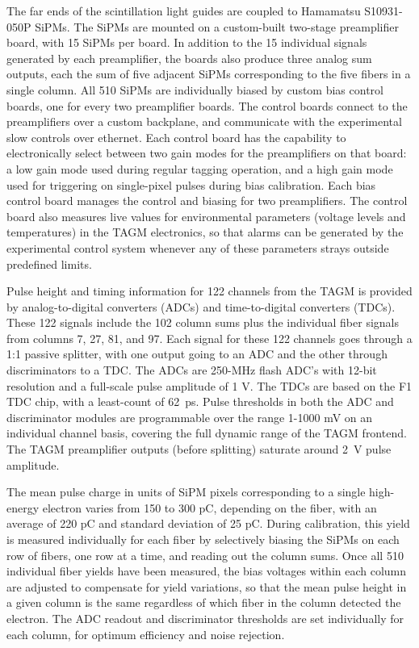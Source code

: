The far ends of the scintillation light guides are coupled to Hamamatsu S10931-050P SiPMs. The SiPMs are mounted on a custom-built two-stage preamplifier board, with 15 SiPMs per board. In addition to the 15 individual signals generated
by each preamplifier, the boards also produce three analog sum outputs, each the sum
of five adjacent SiPMs corresponding to the five fibers in a single column. All 510
SiPMs are individually biased by custom bias control boards, one for every two
preamplifier boards. The control boards connect to the
preamplifiers over a custom backplane, and communicate with the
experimental slow controls over ethernet. Each control board has the
capability to electronically select between two gain modes for the preamplifiers
on that board:
a low gain mode used during regular tagging operation, and a high gain
mode used for triggering on single-pixel pulses during bias calibration.
Each bias control board manages the control and biasing for two preamplifiers.
The control board also measures live values for environmental parameters
(voltage levels and temperatures) in the TAGM electronics, so that alarms can
be generated by the experimental control system whenever any of these parameters
strays outside predefined limits.

Pulse height and timing information for 122 channels from the TAGM is provided by analog-to-digital converters (ADCs) and time-to-digital converters (TDCs). These 122
signals include the 102 column sums plus the individual fiber signals from
columns 7, 27, 81, and 97. Each signal for these 122 channels goes through a 1:1
passive splitter, with one output going to an ADC and the other through
discriminators to a TDC. The ADCs are 250-MHz flash ADC's with 12-bit
resolution and a full-scale pulse amplitude of 1 V. The TDCs are based
on the F1 TDC chip, with a least-count of 62~ps. Pulse thresholds in both
the ADC and discriminator modules are programmable over the range 1-1000 mV
on an individual channel basis, covering the full dynamic range of the TAGM
frontend. The TAGM preamplifier outputs (before splitting) saturate around
2~V pulse amplitude.

The mean pulse charge in units of SiPM pixels corresponding to a
single high-energy electron varies from 150 to 300 pC, depending on the fiber,
with an average of 220 pC and standard deviation of 25 pC. During calibration,
this yield is measured individually for each fiber by selectively biasing
the SiPMs on each row of fibers, one row at a time, and reading out the column
sums. Once all 510 individual fiber yields have been measured, the bias voltages
within each column are adjusted to compensate for yield variations, so
that the mean pulse height in a given column is the same regardless of which
fiber in the column detected the electron. The ADC readout and discriminator
thresholds are set individually for each column, for optimum efficiency and
noise rejection.

